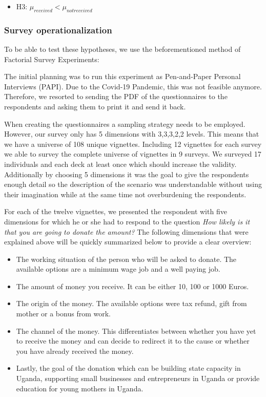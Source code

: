 \documentclass[
  12pt,
]{article}
\providecommand{\tightlist}{%
  \setlength{\itemsep}{0pt}\setlength{\parskip}{0pt}}
\begin{document}
\begin{itemize}
\tightlist
\item
  H3: \(\mu_{received} < \mu_{notreceived}\)
\end{itemize}

\hypertarget{survey-operationalization}{%
\subsubsection{Survey
operationalization}\label{survey-operationalization}}

To be able to test these hypotheses, we use the beforementioned method
of Factorial Survey Experiments:

The initial planning was to run this experiment as Pen-and-Paper
Personal Interviews (PAPI). Due to the Covid-19 Pandemic, this was not
feasible anymore. Therefore, we resorted to sending the PDF of the
questionnaires to the respondents and asking them to print it and send
it back.

When creating the questionnaires a sampling strategy needs to be
employed. However, our survey only has 5 dimensions with 3,3,3,2,2
levels. This means that we have a universe of 108 unique vignettes.
Including 12 vignettes for each survey we able to survey the complete
universe of vignettes in 9 surveys. We surveyed 17 individuals and each
deck at least once which should increase the validity. Additionally by
choosing 5 dimensions it was the goal to give the respondents enough
detail so the description of the scenario was understandable without
using their imagination while at the same time not overburdening the
respondents.

For each of the twelve vignettes, we presented the respondent with five
dimensions for which he or she had to respond to the question \emph{How
likely is it that you are going to donate the amount?} The following
dimensions that were explained above will be quickly summarized below to
provide a clear overview:

\begin{itemize}
\tightlist
\item
  The working situation of the person who will be asked to donate. The
  available options are a minimum wage job and a well paying job.
\item
  The amount of money you receive. It can be either 10, 100 or 1000
  Euros.
\item
  The origin of the money. The available options were tax refund, gift
  from mother or a bonus from work.
\item
  The channel of the money. This differentiates between whether you have
  yet to receive the money and can decide to redirect it to the cause or
  whether you have already received the money.
\item
  Lastly, the goal of the donation which can be building state capacity
  in Uganda, supporting small businesses and entrepreneurs in Uganda or
  provide education for young mothers in Uganda.
\end{itemize}
\end{document}
